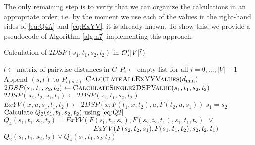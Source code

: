 The only remaining step is to verify that we can organize the calculations in an appropriate order; i.e. by the moment we use each of the values in the right-hand sides of \eqref{eq:Q4A} and \eqref{eq:ExYV}, it is already known. To show this, we provide a pseudocode of Algorithm \ref{alg:n7} implementing this approach.

\begin{algorithm}
\caption{Calculation of $2DSP(s_1, t_1, s_2, t_2)$ in $\mathcal{O}(|V|^7)$} \label{alg:n7}
\begin{algorithmic}[1]
\State $l \gets \text{matrix of pairwise distances in }G$
\State $P_i \gets \text{empty list for all }i = 0, \ldots, |V|-1$
    \State $\text{Append }(s, t)\text{ to }P_{l(s, t)}$
\EndFor
{}
    \State $\textsc{CalculateAllExYVValues}(d_{\min})$ \label{line:calcExYV}
                \State $2DSP(s_1, t_1, s_2, t_2) \gets \textsc{CalculateSingle2DSPValue}(s_1, t_1, s_2, t_2)$
                \State $2DSP(s_2, t_2, s_1, t_1) \gets 2DSP(s_1, t_1, s_2, t_2)$
            \EndFor
        \EndFor
    \EndFor
\EndFor
\EndProcedure
\Statex
{}
                \State $ExYV(x,u,s_1,t_1,t_2) \gets 2DSP(x, F(t_1,x,t_2), u, F(t_2,u,s_1))$
            \EndFor
        \EndFor
    \EndFor
\EndProcedure
\Statex
{}
    \State \Return $s_1 = s_2$
    \State {}
\Else
    \State $\text{Calculate }Q_2(s_1, t_1, s_2, t_2)\text{ using \eqref{eq:Q2}}$
    \State $Q_4(s_1, t_1, s_2, t_2) = ExYV(F(s_1, t_1, s_2), F(s_2, t_2, t_1), s_1, t_1, t_2)\enspace\vee\enspace$ 
    \Statex $\hspace{4.5cm}ExYV(F(s_2, t_2, s_1), F(s_1, t_1, t_2), s_2, t_2, t_1)$ \label{line:useExYV}
    \State \Return $Q_2(s_1, t_1, s_2, t_2) \vee Q_4(s_1, t_1, s_2, t_2)$
\EndIf
\EndProcedure
\end{algorithmic}
\end{algorithm}

